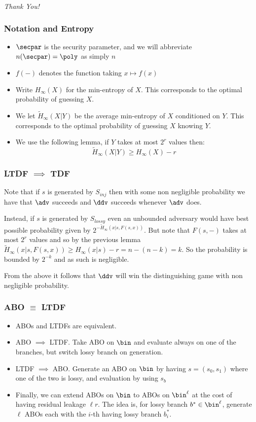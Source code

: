 \documentclass{beamer}
\begin{document}
\begin{frame}{}
    \centering \Large
    \emph{Thank You!}
\end{frame}

\begin{frame}
    \frametitle{Notation and Entropy}
    \begin{itemize}
        \item $\secpar$ is the security parameter, and
              we will abbreviate $n(\secpar) = \poly$ as simply $n$
        \item $f({-})$ denotes the function taking $x \mapsto f(x)$
        \item Write $H_\infty(X)$ for the min-entropy of $X$. This corresponds to the optimal probability of guessing $X$.
        \item We let $\widetilde{H}_\infty(X|Y)$ be the average min-entropy of $X$ conditioned on $Y$.
              This corresponds to the optimal probability of guessing $X$ knowing $Y$.
        \item We use the following lemma, if $Y$ takes at most $2^r$ values then:
              \[ \widetilde{H}_\infty(X|Y) \geq H_\infty(X) - r \]
    \end{itemize}
\end{frame}

\begin{frame}
    \frametitle{LTDF $\implies$ TDF}
    Note that if $s$ is generated by $S_{inj}$ then with some non negligible probability
    we have that $\adv$ succeeds and $\ddv$ succeeds whenever $\adv$ does.

    Instead, if $s$ is generated by $S_{lossy}$ even an unbounded adversary
    would have best possible probability given by $2^{-\widetilde{H}_\infty(x|s, F(s, x))}$.
    But note that $F(s, {-})$ takes at most $2^r$ values and so by the previous
    lemma $\widetilde{H}_\infty(x|s, F(s, x)) \geq H_\infty(x|s) - r = n - (n - k) = k$.
    So the probability is bounded by $2^{-k}$ and as such is negligible.

    From the above it follows that $\ddv$ will win the distinguishing game with non negligible probability.

\end{frame}

\begin{frame}
    \frametitle{ABO $\equiv$ LTDF}
    \begin{itemize}
        \item ABOs and LTDFs are equivalent.
        \item ABO $\implies$ LTDF. Take ABO on $\bin$ and evaluate always on one of the branches, but switch lossy branch on generation.
        \item LTDF $\implies$ ABO. Generate an ABO on $\bin$ by having $s = (s_0, s_1)$ where one of the two is lossy, and evaluation by using $s_b$
        \item Finally, we can extend ABOs on $\bin$ to ABOs on $\bin^\ell$ at the cost of having residual leakage $\ell r$. The idea is,
              for lossy branch $b^* \in \bin^\ell$, generate $\ell$ ABOs each with the $i$-th having lossy branch $b^*_i$.
    \end{itemize}
\end{frame}
\end{document}
